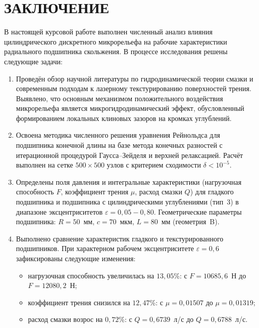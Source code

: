 \section*{ЗАКЛЮЧЕНИЕ}
{}

В настоящей курсовой работе выполнен численный анализ влияния цилиндрического дискретного микрорельефа на рабочие характеристики радиального подшипника скольжения. В процессе исследования решены следующие задачи:

\begin{enumerate}
    \item Проведён обзор научной литературы по гидродинамической теории смазки и современным подходам к лазерному текстурированию поверхностей трения. Выявлено, что основным механизмом положительного воздействия микрорельефа является микрогидродинамический эффект, обусловленный формированием локальных клиновых зазоров на кромках углублений.

    \item Освоена методика численного решения уравнения Рейнольдса для подшипника конечной длины на базе метода конечных разностей с итерационной процедурой Гаусса--Зейделя и верхней релаксацией. Расчёт выполнен на сетке $500 \times 500$ узлов с критерием сходимости $\delta < 10^{-5}$.

    \item Определены поля давления и интегральные характеристики (нагрузочная способность $F$, коэффициент трения $\mu$, расход смазки $Q$) для гладкого подшипника и подшипника с цилиндрическими углублениями (тип~3) в диапазоне эксцентриситетов $\varepsilon = 0{,}05 - 0{,}80$. Геометрические параметры подшипника: $R = 50$~мм, $c = 70$~мкм, $L = 80$~мм (геометрия~B).

    \item Выполнено сравнение характеристик гладкого и текстурированного подшипников. При характерном рабочем эксцентриситете $\varepsilon = 0{,}6$ зафиксированы следующие изменения:
    \begin{itemize}
        \item нагрузочная способность увеличилась на $13{,}05$\%: с $F = 10685{,}6$~Н до $F = 12080{,}2$~Н;
        \item коэффициент трения снизился на $12{,}47$\%: с $\mu = 0{,}01507$ до $\mu = 0{,}01319$;
        \item расход смазки возрос на $0{,}72$\%: с $Q = 0{,}6739$~л/с до $Q = 0{,}6788$~л/с.
    \end{itemize}
\end{enumerate}

